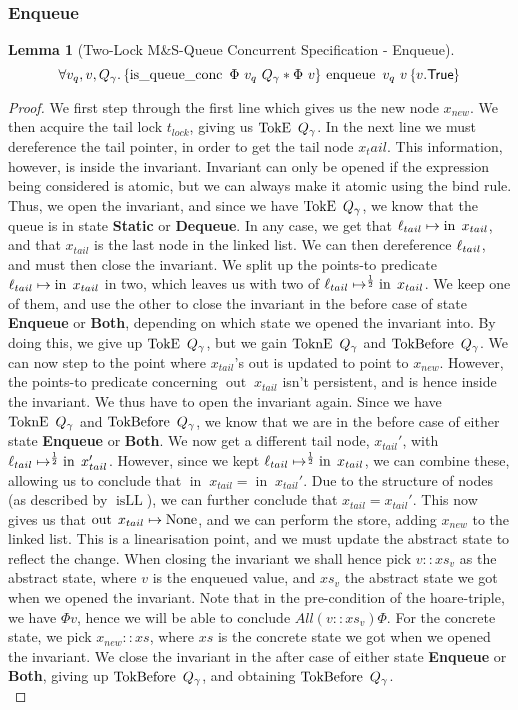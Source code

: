 \documentclass[a4paper, 11pt]{report}
\newtheorem{lemma}[theorem]{Lemma}
\newcommand{\enqueue}{\operatorname{enqueue}}
\newcommand{\tlmsq}{Two-Lock M\&S-Queue\xspace}
\newcommand{\isqueueconc}{\operatorname{is\_queue\_conc}}
\newcommand{\isLL}{\operatorname{isLL}}
\newcommand{\nIn}[1]{\operatorname{in} \; #1}
\newcommand{\nOut}[1]{\operatorname{out} \; #1}
\newcommand{\Tlock}{t_{lock}}
\newcommand{\StaticState}{\textbf{Static}}
\newcommand{\EnqueueState}{\textbf{Enqueue}}
\newcommand{\DequeueState}{\textbf{Dequeue}}
\newcommand{\BothState}{\textbf{Both}}
\newcommand{\Qg}{Q_\gname}
\newcommand{\TokE}[1]{\operatorname{TokE}\ #1}
\newcommand{\TokEQg}{\TokE{\Qg}}
\newcommand{\ToknE}[1]{\operatorname{ToknE}\ #1}
\newcommand{\ToknEQg}{\ToknE{\Qg}}
\newcommand{\TokBefore}[1]{\operatorname{TokBefore}\ #1}
\newcommand{\TokBeforeQg}{\TokBefore{\Qg}}
\newcommand{\TokAfterQg}{\TokBefore{\Qg}}
\newcommand{\tlconcspecenq}{\All v_q, v, Q_\gname. \hoare{\isqueueconc \ \Phi \ v_q \ Q_\gname \star \Phi \ v}{\enqueue\ v_q\ v}{v . \TRUE}}
\begin{document}
\subsubsection{Enqueue}
\begin{lemma}[\tlmsq Concurrent Specification - Enqueue]\label{TLMSQ:spec:conc:enqueue}
  \begin{equation*}
    \tlconcspecenq
  \end{equation*}
\end{lemma}
\begin{proof}
We first step through the first line which gives us the new node $x_{new}$. We then acquire the tail lock $\Tlock$, giving us $\TokEQg$. In the next line we must dereference the tail pointer, in order to get the tail node $x_tail$. This information, however, is inside the invariant. Invariant can only be opened if the expression being considered is atomic, but we can always make it atomic using the bind rule. Thus, we open the invariant, and since we have $\TokEQg$, we know that the queue is in state \StaticState{} or \DequeueState{}. In any case, we get that $\loc_{tail} \mapsto \nIn{x_{tail}}$, and that $x_{tail}$ is the last node in the linked list. We can then dereference $\ell_{tail}$, and must then close the invariant. We split up the points-to predicate $\loc_{tail} \mapsto \nIn{x_{tail}}$ in two, which leaves us with two of $\loc_{tail} \mapsto^{\frac{1}{2}} \nIn{x_{tail}}$. We keep one of them, and use the other to close the invariant in the before case of state \EnqueueState{} or \BothState{}, depending on which state we opened the invariant into. By doing this, we give up $\TokEQg$, but we gain $\ToknEQg$ and $\TokAfterQg$. We can now step to the point where $x_{tail}$'s out is updated to point to $x_{new}$. However, the points-to predicate concerning $\nOut{x_{tail}}$ isn't persistent, and is hence inside the invariant. We thus have to open the invariant again. Since we have $\ToknEQg$ and $\TokAfterQg$, we know that we are in the before case of either state \EnqueueState{} or \BothState{}. We now get a different tail node, $x_{tail}'$, with $\loc_{tail} \mapsto^{\frac{1}{2}} \nIn{x_{tail}'}$. However, since we kept $\loc_{tail} \mapsto^{\frac{1}{2}} \nIn{x_{tail}}$, we can combine these, allowing us to conclude that $\nIn{x_{tail}} = \nIn{x_{tail}'}$. Due to the structure of nodes (as described by $\isLL$), we can further conclude that $x_{tail} = x_{tail}'$. This now gives us that $\nOut{x_{tail}} \mapsto \None$, and we can perform the store, adding $x_{new}$ to the linked list. This is a linearisation point, and we must update the abstract state to reflect the change. When closing the invariant we shall hence pick $v :: xs_v$ as the abstract state, where $v$ is the enqueued value, and $xs_v$ the abstract state we got when we opened the invariant. Note that in the pre-condition of the hoare-triple, we have $\Phi v$, hence we will be able to conclude $All (v :: xs_v) \Phi$. For the concrete state, we pick $x_{new} :: xs$, where $xs$ is the concrete state we got when we opened the invariant. We close the invariant in the after case of either state \EnqueueState{} or \BothState{}, giving up $\TokAfterQg$, and obtaining $\TokBeforeQg$.\\

\end{proof}
\end{document}
